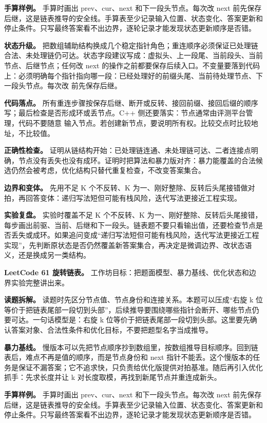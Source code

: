 \textbf{手算样例。} 手算时画出 prev、cur、next 和下一段头节点。每次改 next 前先保存后继，这是链表推导的安全线。手算表至少记录输入位置、状态变化、答案更新和停止条件。只写最终答案看不出边界，逐轮记录才能发现状态更新顺序是否错。

\textbf{状态升级。} 把数组辅助结构换成几个稳定指针角色；重连顺序必须保证已处理链合法、未处理链仍可达。状态字段建议写成：虚拟头、上一段尾、当前段头、当前节点、后继节点；任何改 next 的操作之前都要保存后续入口。不变量要落到代码上：必须明确每个指针指向哪一段：已经处理好的前缀头尾、当前待处理节点、下一段头节点。每次改  前先保存后继。

\textbf{代码落点。} 所有重连步骤按保存后继、断开或反转、接回前缀、接回后缀的顺序写；最后检查是否形成环或丢节点。C++ 侧还要落实：节点通常由评测平台管理，代码不要随意  输入节点。若创建新节点，要说明所有权。比较交点时比较地址，不比较值。

\textbf{正确性检查。} 证明从链结构开始：已处理链连通、未处理链可达、二者连接点明确，节点没有丢失也没有成环。证明时把算法和暴力版对齐：暴力能覆盖的合法候选仍然会被考虑，优化结构只替代重复检查，不改变答案集合。

\textbf{边界和变体。} 先用不足 K 个不反转、K 为一、刚好整除、反转后头尾接错做对拍，再回答变体：递归写法短但可能有栈风险，迭代写法更接近工程实现。

\textbf{实验复盘。} 实验时覆盖不足 K 个不反转、K 为一、刚好整除、反转后头尾接错，每步画出前驱、当前、后继和下一段头。链表题不要只看输出值，还要检查节点是否丢失或成环。如果追问变成“递归写法短但可能有栈风险，迭代写法更接近工程实现”，先判断原状态是否仍然覆盖新答案集合，再决定是微调边界、改状态语义，还是换成另一类结构。

\noindent\textbf{LeetCode 61 旋转链表。} 工作坊目标：把题面模型、暴力基线、优化状态和边界实验完整讲出来。

\textbf{读题拆解。} 读题时先区分节点值、节点身份和连接关系。本题可以压成“右旋 k 位等价于把链表尾部一段切到头部”，后续推导要围绕哪些指针会断开、哪些节点仍要可达。一句话模型是：右旋 k 位等价于把链表尾部一段切到头部。这里要先确认答案对象、合法性条件和优化目标，不要把题型名字当成推导。

\textbf{暴力基线。} 慢版本可以先把节点顺序抄到数组里，按数组推导目标顺序。回到链表后，难点不再是值的顺序，而是节点身份和 next 指针不能丢。这个慢版本的任务是保证不漏答案；它不追求快，只负责给优化版提供对拍基准。随后再引入优化抓手：先求长度并让 k 对长度取模，再找到新尾节点并重连成新头。

\textbf{手算样例。} 手算时画出 prev、cur、next 和下一段头节点。每次改 next 前先保存后继，这是链表推导的安全线。手算表至少记录输入位置、状态变化、答案更新和停止条件。只写最终答案看不出边界，逐轮记录才能发现状态更新顺序是否错。

